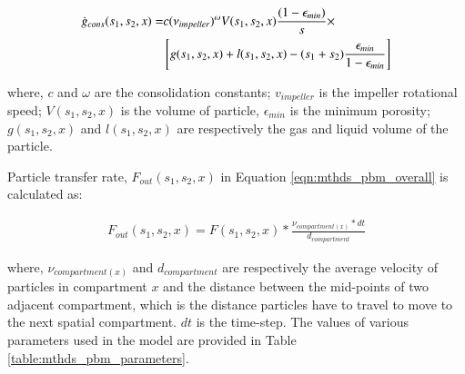 \documentclass[preprint,11pt,authoryear]{elsarticle}
\begin{document}

\begin{align}
\dot{g}_{cons}(s_1,s_2,x)=&c(\nu_{impeller})^{\omega}V(s_1,s_2,x)\frac{(1-\epsilon_{min})}{s}\times 
\notag \\ 
& \left[g(s_1,s_2,x)+l(s_1,s_2,x) -(s_1+s_2)\frac{\epsilon_{min}}{1-\epsilon_{min}}\right]
\end{align}        

\par where, $c$ and $\omega$ are the consolidation constants; $v_{impeller}$ is the impeller 
rotational speed; $V(s_1,s_2,x)$ is the volume of particle, $\epsilon_{min}$ is the minimum porosity; 
$g(s_1,s_2,x)$ and $l(s_1,s_2,x)$ are respectively the gas and liquid volume of the particle.

\par Particle transfer rate, $F_{out}(s_1,s_2,x)$ in Equation \ref{eqn:mthds_pbm_overall} is calculated 
as:

\begin{align}
F_{out}(s_1,s_2,x) = F(s_1,s_2,x)*\frac{\nu_{compartment(x)}*dt}{d_{compartment}}
\end{align}

where, $\nu_{compartment(x)}$ and $d_{compartment}$ are respectively the average velocity of 
particles in compartment $x$ and the distance between the mid-points of two adjacent compartment, 
which is the distance particles have to travel to move to the next spatial compartment. $dt$ is the 
time-step.
The values of various parameters used in the model are provided in Table 
\ref{table:mthds_pbm_parameters}.
\end{document}
